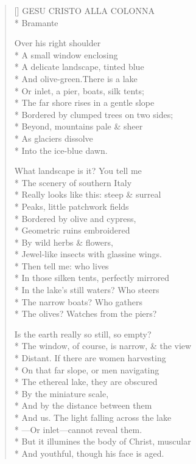 \label{ch:milano_pinocoteca_brera}
\settowidth{\versewidth}{The window, of course, is narrow, \& the view}
\begin{verse}[\versewidth]
GESU CRISTO ALLA COLONNA\\*
Bramante

Over his right shoulder\\*
A small window enclosing\\*
A delicate landscape, tinted blue\\*
And olive-green.\qquad There is a lake\\*
Or inlet, a pier, boats, silk tents;\\*
The far shore rises in a gentle slope\\*
Bordered by clumped trees on two sides;\\*
Beyond, mountains pale \& sheer\\*
As glaciers dissolve\\*
Into the ice-blue dawn.

What landscape is it?  You tell me\\*
The scenery of southern Italy\\*
Really looks like this: steep \& surreal\\*
Peaks, little patchwork fields\\*
Bordered by olive and cypress,\\*
Geometric ruins embroidered\\*
By wild herbs \& flowers,\\*
Jewel-like insects with glassine wings.\\*
Then tell me: who lives\\*
In those silken tents, perfectly mirrored\\*
In the lake's still waters?  Who steers\\*
The narrow boats?  Who gathers\\*
The olives?  Watches from the piers?

Is the earth really so still, so empty?\\*
The window, of course, is narrow, \& the view\\*
Distant. If there are women harvesting\\*
On that far slope, or men navigating\\*
The ethereal lake, they are obscured\\*
By the miniature scale,\\*
And by the distance between them\\*
And us.   The light falling across the lake\\*
---Or inlet---cannot reveal them.\\*
But it illumines the body of Christ, muscular\\*
And youthful, though his face is aged.


\end{verse}
